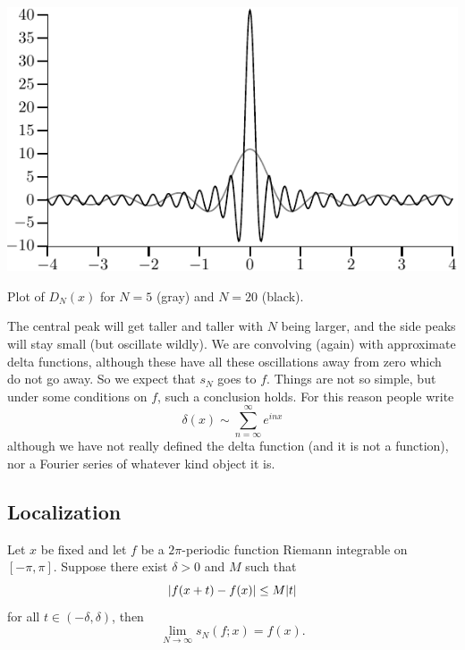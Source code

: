 \begin{myfigureht}
\includegraphics{figures/approxdeltas}
\caption{Plot of $D_N(x)$ for $N=5$ (gray) and $N=20$
(black).\label{fig:approxdeltas}}
\end{myfigureht}

The central peak will get taller and taller with $N$ being larger,
and the side peaks will stay small (but oscillate wildly).
We are convolving (again) with approximate delta functions,
although these have
all these oscillations away from zero which do not go away.  So we expect that
$s_N$ goes to $f$.  Things are not so simple, but under some conditions on
$f$, such a conclusion holds.  For this reason
people write
\begin{equation*}
\delta(x) \sim \sum_{n=\infty}^\infty e^{inx}
\end{equation*}
although we have not really defined the delta function (and it is not a
function), nor a Fourier series of whatever kind object it is.

\subsection{Localization}

\begin{thm}
Let $x$ be fixed and let $f$ be a $2\pi$-periodic function
Riemann integrable on $[-\pi,\pi]$.  Suppose
there exist $\delta > 0$ and $M$ such that
\begin{equation*}
\lvert {f(x+t)-f(x)} \rvert \leq M \lvert {t} \rvert
\end{equation*}
for all $t \in (-\delta,\delta)$, then
\begin{equation*}
\lim_{N \to \infty} s_N(f;x) = f(x) .
\end{equation*}
\end{thm}

